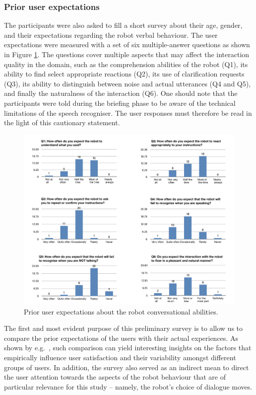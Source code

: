\subsubsection*{Prior user expectations}

The participants were also asked to fill a short survey about their age, gender, and their expectations regarding the robot verbal behaviour. The user expectations were measured with a set of six multiple-answer questions as shown in Figure \ref{fig:expectations}. The questions cover multiple aspects that may affect the interaction quality in the domain, such as the comprehension abilities of the robot (Q1), its ability to find select appropriate reactions (Q2), its use of clarification requests (Q3), its ability to distinguish between noise and actual utterances (Q4 and Q5), and finally the naturalness of the interaction (Q6). One should note that the participants were told during the briefing phase to be aware of the technical limitations of the speech recogniser. The user responses must therefore be read in the light of this cautionary statement. 


\begin{figure}[h]
\begin{center}
\includegraphics[scale=0.5]{imgs/expectations.pdf}
\end{center} 
\caption{Prior user expectations about the robot conversational abilities.}
\label{fig:expectations}
\end{figure}

The first and most evident purpose of this preliminary survey is to allow us to compare the prior expectations of the users with their actual experiences.  As shown by e.g.\ \cite{JokinenH06}, such comparison can yield interesting insights on the factors that empirically influence user satisfaction and their variability amongst different groups of users.  In addition, the survey also served as an indirect mean to direct the user attention towards the aspects of the robot behaviour that are of particular relevance for this study -- namely, the robot's choice of dialogue moves. 



